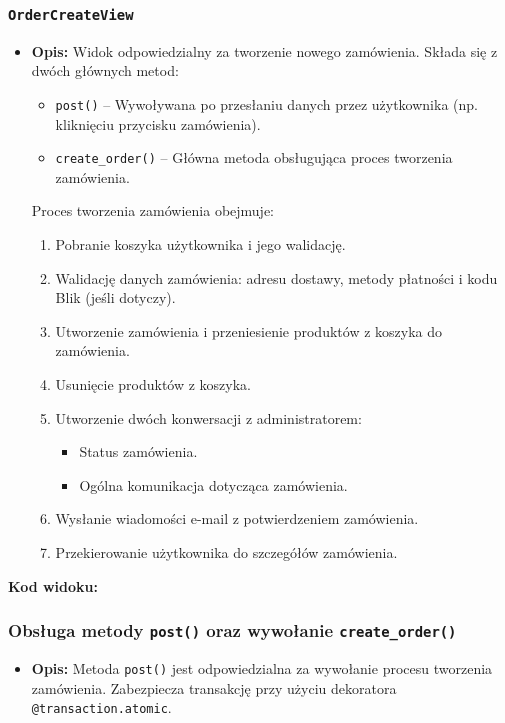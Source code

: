 \documentclass[12pt,a4paper,oneside]{article}
\theoremstyle{definition}
\numberwithin{equation}{section}
\begin{document}
\subsubsection*{\texttt{OrderCreateView}}
\begin{itemize}
    \item \textbf{Opis:} Widok odpowiedzialny za tworzenie nowego zamówienia. Składa się z dwóch głównych metod:
    \begin{itemize}
        \item \texttt{post()} – Wywoływana po przesłaniu danych przez użytkownika (np. kliknięciu przycisku zamówienia).
        \item \texttt{create\_order()} – Główna metoda obsługująca proces tworzenia zamówienia.
    \end{itemize}
    Proces tworzenia zamówienia obejmuje:
    \begin{enumerate}
        \item Pobranie koszyka użytkownika i jego walidację.
        \item Walidację danych zamówienia: adresu dostawy, metody płatności i kodu Blik (jeśli dotyczy).
        \item Utworzenie zamówienia i przeniesienie produktów z koszyka do zamówienia.
        \item Usunięcie produktów z koszyka.
        \item Utworzenie dwóch konwersacji z administratorem:
        \begin{itemize}
            \item Status zamówienia.
            \item Ogólna komunikacja dotycząca zamówienia.
        \end{itemize}
        \item Wysłanie wiadomości e-mail z potwierdzeniem zamówienia.
        \item Przekierowanie użytkownika do szczegółów zamówienia.
    \end{enumerate}
\end{itemize}

\textbf{Kod widoku:}

\subsubsection*{Obsługa metody \texttt{post()} oraz wywołanie \texttt{create\_order()}}
\begin{itemize}
    \item \textbf{Opis:} Metoda \texttt{post()} jest odpowiedzialna za wywołanie procesu tworzenia zamówienia. Zabezpiecza transakcję przy użyciu dekoratora \texttt{@transaction.atomic}.
\end{itemize}
\end{document}
